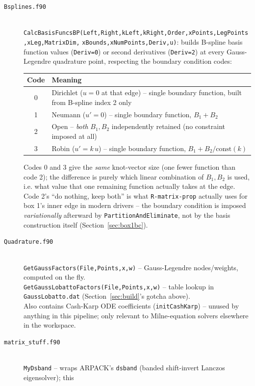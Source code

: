 \documentclass[11pt]{article}
\newcommand{\ttb}[1]{{\ttfamily\seqsplit{#1}}}
\newcommand{\file}[1]{\texttt{#1}}
\newcommand{\sub}[1]{\texttt{#1}}
\begin{document}
\begin{description}
\item[\file{Bsplines.f90}] \hfill \\
  \sub{CalcBasisFuncsBP(Left,Right,kLeft,kRight,Order,xPoints,LegPoints,xLeg,MatrixDim,}
  \sub{xBounds,xNumPoints,Deriv,u)}: builds B-spline basis function values (\texttt{Deriv=0}) or
  second derivatives (\texttt{Deriv=2}) at every Gauss-Legendre quadrature point, respecting the
  boundary condition codes:
  \begin{center}
  \let\texttt\ttb
  \begin{tabular}{cl}
  \toprule
  Code & Meaning \\
  \midrule
  0 & Dirichlet ($u=0$ at that edge) -- single boundary function, built from B-spline index 2 only \\
  1 & Neumann ($u'=0$) -- single boundary function, $B_1+B_2$ \\
  2 & Open -- \emph{both} $B_1,B_2$ independently retained (no constraint imposed at all) \\
  3 & Robin ($u'=k\,u$) -- single boundary function, $B_1+B_2/\text{const}(k)$ \\
  \bottomrule
  \end{tabular}
  \end{center}
  Codes 0 and 3 give the \emph{same} knot-vector size (one fewer function than code 2); the
  difference is purely which linear combination of $B_1,B_2$ is used, i.e. what value that one
  remaining function actually takes at the edge. Code 2's ``do nothing, keep both'' is what
  \texttt{R-matrix-prop} actually uses for box 1's inner edge in modern drivers -- the boundary
  condition is imposed \emph{variationally} afterward by \sub{PartitionAndEliminate}, not by the
  basis construction itself (Section~\ref{sec:box1bc}).
\item[\file{Quadrature.f90}] \hfill \\
  \sub{GetGaussFactors(File,Points,x,w)} -- Gauss-Legendre nodes/weights, computed on the fly. \\
  \sub{GetGaussLobattoFactors(File,Points,x,w)} -- table lookup in \file{GaussLobatto.dat}
  (Section~\ref{sec:build}'s gotcha above). \\
  Also contains Cash-Karp ODE coefficients (\sub{initCashKarp}) -- unused by anything in this
  pipeline; only relevant to Milne-equation solvers elsewhere in the workspace.
\item[\file{matrix\_stuff.f90}] \hfill \\
  \sub{MyDsband} -- wraps ARPACK's \texttt{dsband} (banded shift-invert Lanczos eigensolver); this

\end{description}
\end{document}
